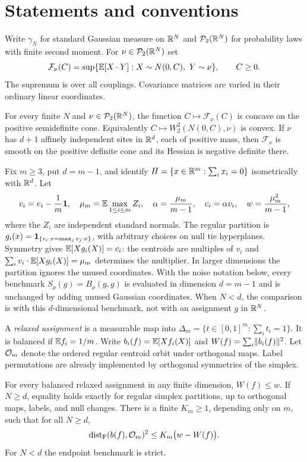 \section{Statements and conventions}
Write $\gamma_N$ for standard Gaussian measure on $\mathbb R^N$ and $\mathcal P_2(\mathbb R^N)$
for probability laws with finite second moment. For $\nu\in\mathcal P_2(\mathbb R^N)$ set
\[
 \mathcal F_\nu(C)=\sup\{\mathbb E[X\cdot Y]:X\sim N(0,C),\ Y\sim\nu\},
 \qquad C\geq0.
\]
The supremum is over all couplings. Covariance matrices are varied in their
ordinary linear coordinates.

\begin{theorem}\label{thm:covariance}
For every finite $N$ and $\nu\in\mathcal P_2(\mathbb R^N)$, the function
$C\mapsto\mathcal F_\nu(C)$ is concave on the positive semidefinite cone.
Equivalently $C\mapsto W_2^2(N(0,C),\nu)$ is convex.
If $\nu$ has $d+1$ affinely independent sites in $\mathbb R^d$, each of positive
mass, then $\mathcal F_\nu$ is smooth on the positive definite cone and
its Hessian is negative definite there.
\end{theorem}

Fix $m\geq3$, put $d=m-1$, and identify
$H=\{x\in\mathbb R^m:\sum_i x_i=0\}$ isometrically with $\mathbb R^d$.
Let
\[
 v_i=e_i-\frac1m\mathbf 1,\quad
 \mu_m=\mathbb E\max_{1\leq i\leq m}Z_i,\quad
 \alpha=\frac{\mu_m}{m-1},\quad
 c_i=\alpha v_i,\quad
 w=\frac{\mu_m^2}{m-1},
\]
where the $Z_i$ are independent standard normals. The regular partition is
$g_i(x)=\mathbf 1_{\{v_i\cdot x=\max_j v_j\cdot x\}}$, with arbitrary choices on
null tie hyperplanes. Symmetry gives $\mathbb E[Xg_i(X)]=c_i$:
the centroids are multiples of $v_i$ and
$\sum_i v_i\cdot\mathbb E[Xg_i(X)]=\mu_m$ determines the multiplier.
In larger dimensions the partition ignores the unused coordinates.
With the noise notation below, every benchmark $S_\rho(g)=B_\rho(g,g)$ is
evaluated in dimension $d=m-1$ and is unchanged by adding unused Gaussian
coordinates. When $N<d$, the comparison is with this $d$-dimensional benchmark,
not with an assignment $g$ in $\mathbb R^N$.

A \emph{relaxed assignment} is a measurable map into
$\Delta_m=\{t\in[0,1]^m:\sum_i t_i=1\}$. It is balanced if
$\mathbb E f_i=1/m$. Write $b_i(f)=\mathbb E[Xf_i(X)]$ and
$W(f)=\sum_i\lVert b_i(f)\rVert^2$. Let $\mathcal O_m$ denote the ordered regular
centroid orbit under orthogonal maps. Label permutations are already
implemented by orthogonal symmetries of the simplex.

\begin{theorem}\label{thm:endpoint}
For every balanced relaxed assignment in any finite dimension,
$W(f)\leq w$. If $N\geq d$, equality holds exactly for regular simplex
partitions, up to orthogonal maps, labels, and null changes. There is a finite
$K_m\geq1$, depending only on $m$, such that for all $N\geq d$,
\begin{equation}\label{eq:Hm}
 \operatorname{dist}_{\mathrm F}(b(f),\mathcal O_m)^2\leq K_m\bigl(w-W(f)\bigr).
\end{equation}
For $N<d$ the endpoint benchmark is strict.
\end{theorem}

